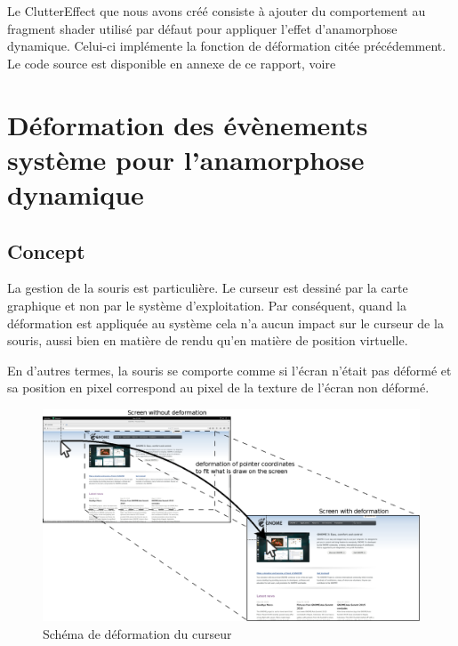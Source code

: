 Le ClutterEffect que nous avons créé consiste à ajouter du comportement au fragment shader utilisé par défaut pour appliquer l’effet d’anamorphose dynamique. Celui-ci implémente la fonction de déformation citée précédemment. Le code source est disponible en annexe de ce rapport, voire 






























\section{Déformation des évènements système pour l'anamorphose dynamique}

\subsection{Concept}

La gestion de la souris est particulière. Le curseur est dessiné par la carte graphique et non par le système d’exploitation. Par conséquent, quand la déformation est appliquée au système cela n’a aucun impact sur le curseur de la souris, aussi bien en matière de rendu qu’en matière de position virtuelle.

En d'autres termes, la souris se comporte comme si l'écran n'était pas déformé et sa position en pixel correspond au pixel de la texture de l'écran non déformé. 

\begin{figure}[!h]
	\center	
	\includegraphics[scale=0.25]{image/deformationCurseur.png}
	\caption{Schéma de déformation du curseur}
	\label{fig:deformationCurseur}
\end{figure}


